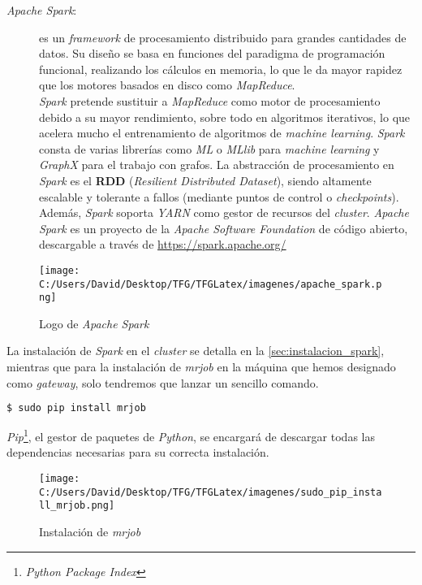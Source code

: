 \begin{description}
  \item[\textit{Apache Spark}:] es un \textit{framework} de procesamiento 
  distribuido para grandes cantidades de datos. Su diseño se basa en funciones del paradigma de programación 
  funcional, realizando los cálculos en memoria, lo que le da mayor rapidez que los motores basados en disco 
  como \textit{MapReduce}.\\
  \textit{Spark} pretende sustituir a \textit{MapReduce} como motor de procesamiento debido a su 
  mayor rendimiento, sobre todo en algoritmos iterativos, lo que acelera mucho el entrenamiento 
  de algoritmos de \textit{machine learning}.
  \textit{Spark} consta de varias librerías como \textit{ML} o \textit{MLlib} para \textit{machine learning} y 
  \textit{GraphX} para el trabajo con grafos.
  La abstracción de procesamiento en \textit{Spark} es el \textbf{RDD} (\textit{Resilient Distributed Dataset}), 
  siendo altamente escalable y tolerante a fallos (mediante puntos de control o \textit{checkpoints}).
  Además, \textit{Spark} soporta \textit{YARN} como gestor de recursos del \textit{cluster}.
  \textit{Apache Spark} es un proyecto de la \textit{Apache Software Foundation} de código abierto, descargable a 
  través de \url{https://spark.apache.org/}
\end{description}


\begin{figure}[!htpb]
  \centering
  \texttt{[image: C:/Users/David/Desktop/TFG/TFGLatex/imagenes/apache\_spark.png]}
  \caption[Logo \textit{Apache Spark}]{Logo de \textit{Apache Spark}}
  \label{spark-devs1}
\end{figure}

La instalación de \textit{Spark} en el \textit{cluster} se detalla en la \autoref{sec:instalacion_spark},
mientras que para la instalación de \textit{mrjob} en la máquina que hemos designado como \textit{gateway},
solo tendremos que lanzar un sencillo comando.\\

\begin{lstlisting}[language=bash, numbers=none]
$ sudo pip install mrjob
\end{lstlisting}

\textit{Pip}\footnote{\textit{Python Package Index}}, el gestor de paquetes de \textit{Python}, 
se encargará de descargar todas las dependencias necesarias para su correcta instalación.

\begin{figure}[!htpb]
  \centering
  \texttt{[image: C:/Users/David/Desktop/TFG/TFGLatex/imagenes/sudo\_pip\_install\_mrjob.png]}
  \caption[Instalación de \textit{mrjob}]{Instalación de \textit{mrjob}}
  \label{sudo_pip_install_mrjob}
\end{figure}

%

\clearpage